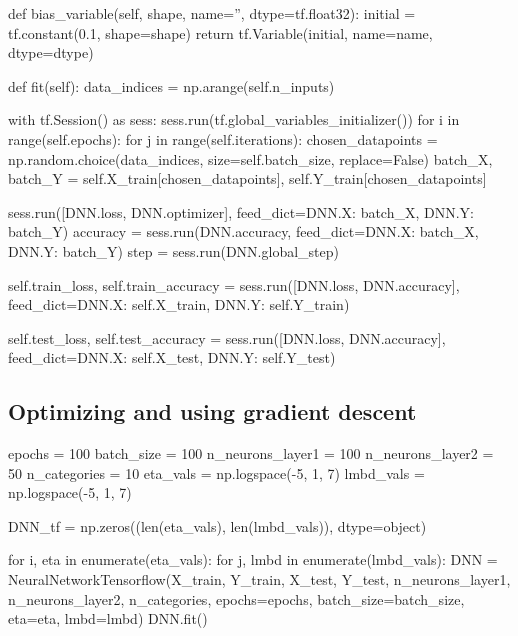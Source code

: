 \documentclass[%
oneside,                 %
final,                   %
10pt]{article}
\begin{document}
    def bias_variable(self, shape, name='', dtype=tf.float32):
        initial = tf.constant(0.1, shape=shape)
        return tf.Variable(initial, name=name, dtype=dtype)
    
    def fit(self):
        data_indices = np.arange(self.n_inputs)

        with tf.Session() as sess:
            sess.run(tf.global_variables_initializer())
            for i in range(self.epochs):
                for j in range(self.iterations):
                    chosen_datapoints = np.random.choice(data_indices, size=self.batch_size, replace=False)
                    batch_X, batch_Y = self.X_train[chosen_datapoints], self.Y_train[chosen_datapoints]
            
                    sess.run([DNN.loss, DNN.optimizer],
                        feed_dict={DNN.X: batch_X,
                                   DNN.Y: batch_Y})
                    accuracy = sess.run(DNN.accuracy,
                        feed_dict={DNN.X: batch_X,
                                   DNN.Y: batch_Y})
                    step = sess.run(DNN.global_step)
    
            self.train_loss, self.train_accuracy = sess.run([DNN.loss, DNN.accuracy],
                feed_dict={DNN.X: self.X_train,
                           DNN.Y: self.Y_train})
        
            self.test_loss, self.test_accuracy = sess.run([DNN.loss, DNN.accuracy],
                feed_dict={DNN.X: self.X_test,
                           DNN.Y: self.Y_test})
\epycod


\subsection{Optimizing and using gradient descent}

\bpycod
epochs = 100
batch_size = 100
n_neurons_layer1 = 100
n_neurons_layer2 = 50
n_categories = 10
eta_vals = np.logspace(-5, 1, 7)
lmbd_vals = np.logspace(-5, 1, 7)
\epycod


\bpycod
DNN_tf = np.zeros((len(eta_vals), len(lmbd_vals)), dtype=object)
        
for i, eta in enumerate(eta_vals):
    for j, lmbd in enumerate(lmbd_vals):
        DNN = NeuralNetworkTensorflow(X_train, Y_train, X_test, Y_test,
                                      n_neurons_layer1, n_neurons_layer2, n_categories,
                                      epochs=epochs, batch_size=batch_size, eta=eta, lmbd=lmbd)
        DNN.fit()
        
\end{document}
